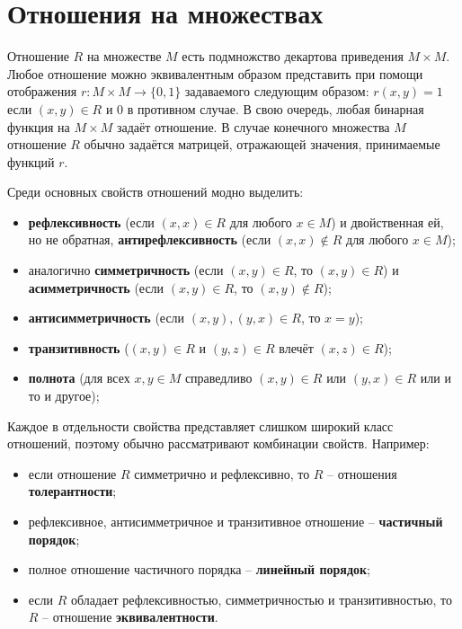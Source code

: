 \documentclass[a4paper,12pt]{extreport}
\title{\rus{Основы теории измерений в задачах получения и обработки экспертных оценок}}
\author{\rus{Назаров Иван,} \rus{101мНОД(ИССА)}}
\begin{document}
\maketitle

\section*{Отношения на множествах} %
\label{sec:binary_relations}


Отношение $R$ на множестве $M$ есть подмножство декартова приведения $M\times M$.
Любое отношение можно эквивалентным образом представить при помощи отображения
$r:M\times M\to \{0,1\}$ задаваемого следующим образом: $r(x,y) = 1$ если $(x,y)\in R$
и $0$ в противном случае. В свою очередь, любая бинарная функция на $M\times M$
задаёт отношение. В случае конечного множества $M$ отношение $R$ обычно задаётся
матрицей, отражающей значения, принимаемые функций $r$.

Среди основных свойств отношений модно выделить: \begin{itemize}
	\item \textbf{рефлексивность} (если $(x,x)\in R$ для любого $x\in M$) и двойственная
	ей, но не обратная, \textbf{антирефлексивность} (если $(x,x)\notin R$ для любого $x\in M$);
	\item аналогично \textbf{симметричность} (если $(x,y)\in R$, то $(x,y)\in R$) и
	\textbf{асимметричность} (если $(x,y)\in R$, то $(x,y)\notin R$);
	\item \textbf{антисимметричность} (если $(x,y),(y,x)\in R$, то $x=y$);
	\item \textbf{транзитивность} ($(x,y)\in R$ и $(y,z)\in R$ влечёт $(x,z)\in R$);
	\item \textbf{полнота} (для всех $x,y\in M$ справедливо $(x,y)\in R$ или $(y,x)\in R$
	или и то и другое);
\end{itemize}

Каждое в отдельности свойства представляет слишком широкий класс отношений, поэтому
обычно рассматривают комбинации свойств. Например: \begin{itemize}
	\item если отношение $R$ симметрично и рефлексивно, то $R$ -- отношения
	\textbf{толерантности};
	\item рефлексивное, антисимметричное и транзитивное отношение -- \textbf{частичный порядок};
	\item полное отношение частичного порядка -- \textbf{линейный порядок};
	\item если $R$ обладает рефлексивностью, симметричностью и транзитивностью,
	то $R$ -- отношение \textbf{эквивалентности}.
\end{itemize}
\end{document}
